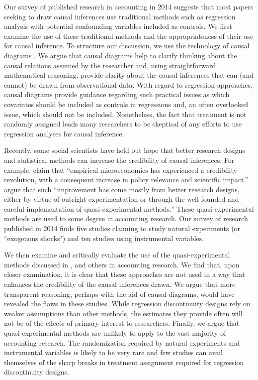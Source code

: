 \documentclass[11pt,reqno]{amsart}
\begin{document}
\begin{doublespace}
Our survey of published research in accounting in 2014 suggests that most papers seeking to draw causal inferences use traditional methods such as regression analysis with potential confounding variables included as controls.
We first examine the use of these traditional methods and the appropriateness of their use for causal inference.
To structure our discussion, we use the technology of causal diagrams \citep{Pearl:2009kh}.
We argue that causal diagrams help to clarify thinking about the causal relations assumed by the researcher and, using straightforward mathematical reasoning, provide clarity about the causal inferences that can (and cannot) be drawn from observational data.
With regard to regression approaches, causal diagrams provide guidance regarding such practical issues as which covariates should be included as controls in regressions and, an often overlooked issue, which should not be included.
Nonetheless, the fact that treatment is not randomly assigned leads many researchers to be skeptical of any efforts to use regression analyses for causal inference.

Recently, some social scientists have held out hope that better research designs and statistical methods can increase the credibility of causal inferences.
For example, \citet{Angrist:2010jv} claim that ``empirical microeconomics has experienced a credibility revolution, with a consequent increase in policy relevance and scientific impact.''  
\citet[p. 26]{Angrist:2010jv} argue that such ``improvement has come mostly from better research designs, either by virtue of outright experimentation or through the well-founded and careful implementation of quasi-experimental methods."
These quasi-experimental methods are used to some degree in accounting research. 
Our survey of research published in 2014 finds five studies claiming to study natural experiments (or ``exogenous shocks") and ten studies using instrumental variables.

We then examine and critically evaluate the use of the quasi-experimental methods discussed in \citet{Angrist:2010jv}, \citet{Roberts:2013cz} and others in accounting research.
We find that, upon closer examination, it is clear that these approaches are not used in a way that enhances the credibility of the causal inferences drawn.
We argue that more transparent reasoning, perhaps with the aid of causal diagrams, would have revealed the flaws in these studies.
While regression discontinuity designs rely on weaker assumptions than other methods, the estimates they provide often will not be of the effects of primary interest to researchers.
Finally, we argue that quasi-experimental methods are unlikely to apply to the vast majority of accounting research.
The randomization required by natural experiments and instrumental variables is likely to be very rare and few studies can avail themselves of the sharp breaks in treatment assignment required for regression discontinuity designs.


\end{doublespace}
\end{document}
